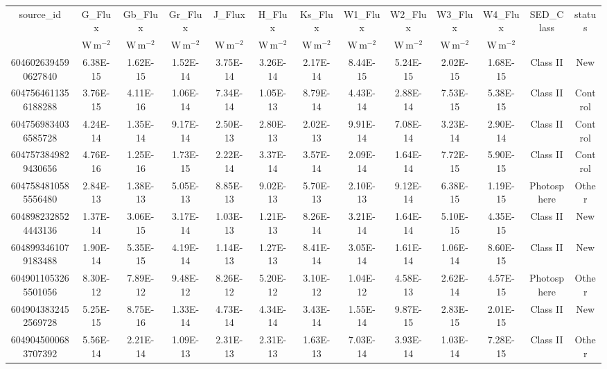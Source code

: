 \begin{table}
\begin{tabular}{ccccccccccccc}
source_id & G\_Flux & Gb\_Flux & Gr\_Flux & J\_Flux & H\_Flux & Ks\_Flux & W1\_Flux & W2\_Flux & W3\_Flux & W4\_Flux & SED_Class & status \\
 & $\mathrm{W\,m^{-2}}$ & $\mathrm{W\,m^{-2}}$ & $\mathrm{W\,m^{-2}}$ & $\mathrm{W\,m^{-2}}$ & $\mathrm{W\,m^{-2}}$ & $\mathrm{W\,m^{-2}}$ & $\mathrm{W\,m^{-2}}$ & $\mathrm{W\,m^{-2}}$ & $\mathrm{W\,m^{-2}}$ & $\mathrm{W\,m^{-2}}$ &  &  \\
6046026394590627840 & 6.38E-15 & 1.62E-15 & 1.52E-14 & 3.75E-14 & 3.26E-14 & 2.17E-14 & 8.44E-15 & 5.24E-15 & 2.02E-15 & 1.68E-15 & Class  II & New \\
6047564611356188288 & 3.76E-15 & 4.11E-16 & 1.06E-14 & 7.34E-14 & 1.05E-13 & 8.79E-14 & 4.43E-14 & 2.88E-14 & 7.53E-15 & 5.38E-15 & Class  II & Control \\
6047569834036585728 & 4.24E-14 & 1.35E-14 & 9.17E-14 & 2.50E-13 & 2.80E-13 & 2.02E-13 & 9.91E-14 & 7.08E-14 & 3.23E-14 & 2.90E-14 & Class  II & Control \\
6047573849829430656 & 4.76E-16 & 1.25E-16 & 1.73E-15 & 2.22E-14 & 3.37E-14 & 3.57E-14 & 2.09E-14 & 1.64E-14 & 7.72E-15 & 5.90E-15 & Class  II & Control \\
6047584810585556480 & 2.84E-13 & 1.38E-13 & 5.05E-13 & 8.85E-13 & 9.02E-13 & 5.70E-13 & 2.10E-13 & 9.12E-14 & 6.38E-15 & 1.19E-15 & Photosphere & Other \\
6048982328524443136 & 1.37E-14 & 3.06E-15 & 3.17E-14 & 1.03E-13 & 1.21E-13 & 8.26E-14 & 3.21E-14 & 1.64E-14 & 5.10E-15 & 4.35E-15 & Class  II & New \\
6048993461079183488 & 1.90E-14 & 5.35E-15 & 4.19E-14 & 1.14E-13 & 1.27E-13 & 8.41E-14 & 3.05E-14 & 1.61E-14 & 1.06E-14 & 8.60E-15 & Class  II & New \\
6049011053265501056 & 8.30E-12 & 7.89E-12 & 9.48E-12 & 8.26E-12 & 5.20E-12 & 3.10E-12 & 1.04E-12 & 4.58E-13 & 2.62E-14 & 4.57E-15 & Photosphere & Other \\
6049043832452569728 & 5.25E-15 & 8.75E-16 & 1.33E-14 & 4.73E-14 & 4.34E-14 & 3.43E-14 & 1.55E-14 & 9.87E-15 & 2.83E-15 & 2.01E-15 & Class  II & New \\
6049045000683707392 & 5.56E-14 & 2.21E-14 & 1.09E-13 & 2.31E-13 & 2.31E-13 & 1.63E-13 & 7.03E-14 & 3.93E-14 & 1.03E-14 & 7.28E-15 & Class  II & Other \\
\end{tabular}
\end{table}
